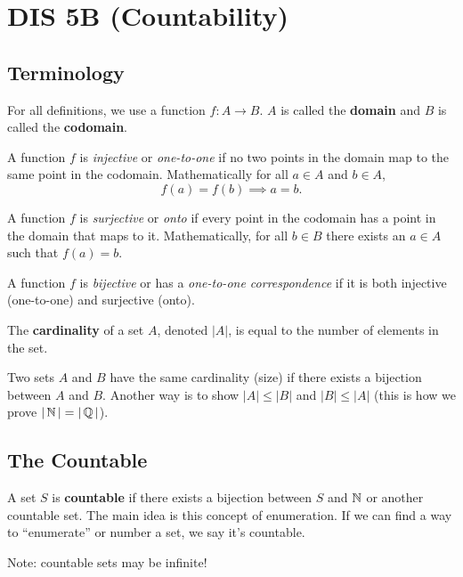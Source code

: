 \section{DIS 5B (Countability)}


\subsection{Terminology}
For all definitions, we use a function $f: A \to B$. $A$ is called the \textbf{domain} and $B$ is called the \textbf{codomain}. 
\begin{definition}
    A function $f$ is \textit{injective} or \textit{one-to-one} if no two points in the domain map to the same point in the codomain. Mathematically for all $a \in A$ and $b \in A$, \[ f(a) = f(b) \implies a = b. \] 
\end{definition}
\begin{definition}
    A function $f$ is \textit{surjective} or \textit{onto} if every point in the codomain has a point in the domain that maps to it. Mathematically, for all $b \in B$ there exists an $a \in A$ such that $f(a) = b$. 
\end{definition}
\begin{definition}
    A function $f$ is \textit{bijective} or has a \textit{one-to-one correspondence} if it is both injective (one-to-one) and surjective (onto). 
\end{definition}

\begin{definition}[Cardinality]
    The \textbf{cardinality} of a set $A$, denoted $|A|$, is equal to the number of elements in the set. 
\end{definition}
Two sets $A$ and $B$ have the same cardinality (size) if there exists a bijection between $A$ and $B$. Another way is to show $|A| \le |B|$ and $|B| \le |A|$ (this is how we prove $|\operatorname{\mathbb{N}}| = |\operatorname{\mathbb{Q}}|$). 

\subsection{The Countable}
A set $S$ is \textbf{countable} if there exists a bijection between $S$ and $\operatorname{\mathbb{N}}$ or another countable set. The main idea is this concept of enumeration. If we can find a way to ``enumerate'' or number a set, we say it's countable. 

Note: countable sets may be infinite!

